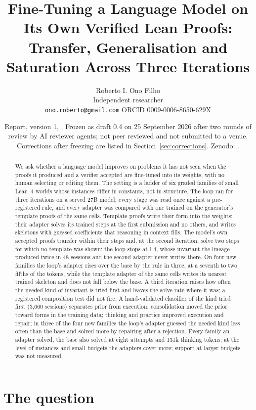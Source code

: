 \documentclass[11pt]{article}
\title{Fine-Tuning a Language Model on Its Own Verified Lean Proofs:\\
Transfer, Generalisation and Saturation Across Three Iterations}
\author{Roberto I. Ono Filho\\ Independent researcher\\
\texttt{ono.roberto@gmail.com} \quad ORCID \href{https://orcid.org/0009-0006-8650-629X}{0009-0006-8650-629X}}
\date{\small Report, version 1, \reportdate. Frozen as draft 0.4 on 25 September 2026 after two rounds of review by AI reviewer agents; not peer reviewed and not submitted to a venue. Corrections after freezing are listed in Section~\ref{sec:corrections}. Zenodo: \href{https://doi.org/\thisdoi}{\thisdoi}.}
\begin{document}
\maketitle

\begin{abstract}
We ask whether a language model improves on problems it has not seen when
the proofs it produced and a verifier accepted are fine-tuned into its
weights, with no human selecting or editing them. The setting is a ladder
of six graded families of small Lean~4 worlds whose instances differ in
constants, not in structure. The loop ran for three iterations on a
served 27B model; every stage was read once against a pre-registered
rule, and every adapter was compared with one trained on the generator's
template proofs of the same cells. Template proofs write their form into
the weights: their adapter solves its trained steps at the first
submission and no others, and writes skeletons with guessed coefficients
that reasoning in context fills. The model's own accepted proofs transfer
within their steps and, at the second iteration, solve two steps for
which no template was shown; the loop stops at L4, whose invariant the
lineage produced twice in 48 sessions and the second adapter never writes
there. On four new families the loop's adapter rises over the base by the
rule in three, at a seventh to two fifths of the tokens, while the
template adapter of the same cells writes its nearest trained skeleton
and does not fall below the base. A third iteration raises how often the
needed kind of invariant is tried first and leaves the solve rate where
it was; a registered composition test did not fire. A hand-validated
classifier of the kind tried first (3,660 sessions) separates prior from
execution: consolidation moved the prior toward forms in the training
data; thinking and practice improved execution and repair; in three of
the four new families the loop's adapter guessed the needed kind less
often than the base and solved more by repairing after a rejection. Every
family an adapter solved, the base also solved at eight attempts and 131k
thinking tokens; at the level of instances and small budgets the adapters
cover more; support at larger budgets was not measured.
\end{abstract}

\section{The question}
\label{sec:question}
\end{document}
